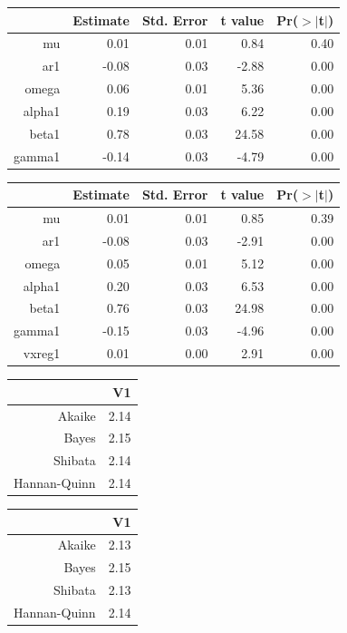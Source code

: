 \documentclass[11pt,preprint, authoryear]{elsarticle}
\let\origtable\table
\let\endorigtable\endtable
\renewenvironment{table}[1][2] {
    \expandafter\origtable\expandafter[H]
} {
    \endorigtable
}
\numberwithin{equation}{section}
\numberwithin{figure}{section}
\numberwithin{table}{section}
\begin{document}
\begin{table}[H]
\centering
\begin{tabular}{rrrrr}
  \hline
 &  Estimate &  Std. Error &  t value & Pr($>$$|$t$|$) \\ 
  \hline
mu & 0.01 & 0.01 & 0.84 & 0.40 \\ 
  ar1 & -0.08 & 0.03 & -2.88 & 0.00 \\ 
  omega & 0.06 & 0.01 & 5.36 & 0.00 \\ 
  alpha1 & 0.19 & 0.03 & 6.22 & 0.00 \\ 
  beta1 & 0.78 & 0.03 & 24.58 & 0.00 \\ 
  gamma1 & -0.14 & 0.03 & -4.79 & 0.00 \\ 
   \hline
\end{tabular}
\caption{Coefficients: ABSA GARCH11 \label{GARCH-A}} 
\end{table}\begin{table}[H]
\centering
\begin{tabular}{rrrrr}
  \hline
 &  Estimate &  Std. Error &  t value & Pr($>$$|$t$|$) \\ 
  \hline
mu & 0.01 & 0.01 & 0.85 & 0.39 \\ 
  ar1 & -0.08 & 0.03 & -2.91 & 0.00 \\ 
  omega & 0.05 & 0.01 & 5.12 & 0.00 \\ 
  alpha1 & 0.20 & 0.03 & 6.53 & 0.00 \\ 
  beta1 & 0.76 & 0.03 & 24.98 & 0.00 \\ 
  gamma1 & -0.15 & 0.03 & -4.96 & 0.00 \\ 
  vxreg1 & 0.01 & 0.00 & 2.91 & 0.00 \\ 
   \hline
\end{tabular}
\caption{Coefficients: ABSA GARCH11 with Sanlam external regressor  \label{GARCH-B}} 
\end{table}\begin{table}[H]
\centering
\begin{tabular}{rr}
  \hline
 & V1 \\ 
  \hline
Akaike & 2.14 \\ 
  Bayes & 2.15 \\ 
  Shibata & 2.14 \\ 
  Hannan-Quinn & 2.14 \\ 
   \hline
\end{tabular}
\caption{Infocriteria: ABSA GARCH11 \label{GARCH-C}} 
\end{table}\begin{table}[H]
\centering
\begin{tabular}{rr}
  \hline
 & V1 \\ 
  \hline
Akaike & 2.13 \\ 
  Bayes & 2.15 \\ 
  Shibata & 2.13 \\ 
  Hannan-Quinn & 2.14 \\ 
   \hline
\end{tabular}
\caption{Infocriteria: GARCH11 with Sanlam external regressor  \label{GARCH-D}} 
\end{table}
\end{document}
